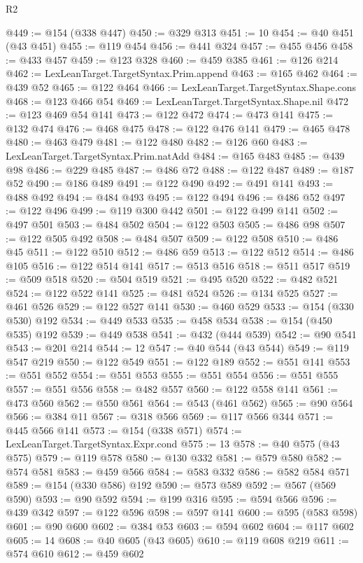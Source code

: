 \begin{lexlean}{R2}
\begin{coremodule}
{{{{{{{{{{{{{{{{{{{{{{{{{{{{{{{{{{{{{{{{{{{{{{{{{{{{{{{{{{{{{{{{{{{{{{{{{{{{{{{{{{{{{{{{{{{{@449 := @154 (@338 @447)
@450 := @329 @313
@451 := 10
@454 := @40 @451 (@43 @451)
@455 := @119 @454
@456 := @441 @324
@457 := @455 @456
@458 := @433 @457
@459 := @123 @328
@460 := @459 @385
@461 := @126 @214
@462 := LexLeanTarget.TargetSyntax.Prim.append
@463 := @165 @462
@464 := @439 @52
@465 := @122 @464
@466 := LexLeanTarget.TargetSyntax.Shape.cons
@468 := @123 @466 @54
@469 := LexLeanTarget.TargetSyntax.Shape.nil
@472 := @123 @469 @54 @141
@473 := @122 @472
@474 := @473 @141
@475 := @132 @474
@476 := @468 @475
@478 := @122 @476 @141
@479 := @465 @478
@480 := @463 @479
@481 := @122 @480
@482 := @126 @60
@483 := LexLeanTarget.TargetSyntax.Prim.natAdd
@484 := @165 @483
@485 := @439 @98
@486 := @229 @485
@487 := @486 @72
@488 := @122 @487
@489 := @187 @52
@490 := @186 @489
@491 := @122 @490
@492 := @491 @141
@493 := @488 @492
@494 := @484 @493
@495 := @122 @494
@496 := @486 @52
@497 := @122 @496
@499 := @119 @300 @442
@501 := @122 @499 @141
@502 := @497 @501
@503 := @484 @502
@504 := @122 @503
@505 := @486 @98
@507 := @122 @505 @492
@508 := @484 @507
@509 := @122 @508
@510 := @486 @45
@511 := @122 @510
@512 := @486 @59
@513 := @122 @512
@514 := @486 @105
@516 := @122 @514 @141
@517 := @513 @516
@518 := @511 @517
@519 := @509 @518
@520 := @504 @519
@521 := @495 @520
@522 := @482 @521
@524 := @122 @522 @141
@525 := @481 @524
@526 := @134 @525
@527 := @461 @526
@529 := @122 @527 @141
@530 := @460 @529
@533 := @154 (@330 @530) @192
@534 := @449 @533
@535 := @458 @534
@538 := @154 (@450 @535) @192
@539 := @449 @538
@541 := @432 (@444 @539)
@542 := @90 @541
@543 := @201 @214
@544 := 12
@547 := @40 @544 (@43 @544)
@549 := @119 @547 @219
@550 := @122 @549
@551 := @122 @189
@552 := @551 @141
@553 := @551 @552
@554 := @551 @553
@555 := @551 @554
@556 := @551 @555
@557 := @551 @556
@558 := @482 @557
@560 := @122 @558 @141
@561 := @473 @560
@562 := @550 @561
@564 := @543 (@461 @562)
@565 := @90 @564
@566 := @384 @11
@567 := @318 @566
@569 := @117 @566 @344
@571 := @445 @566 @141
@573 := @154 (@338 @571)
@574 := LexLeanTarget.TargetSyntax.Expr.cond
@575 := 13
@578 := @40 @575 (@43 @575)
@579 := @119 @578
@580 := @130 @332
@581 := @579 @580
@582 := @574 @581
@583 := @459 @566
@584 := @583 @332
@586 := @582 @584 @571
@589 := @154 (@330 @586) @192
@590 := @573 @589
@592 := @567 (@569 @590)
@593 := @90 @592
@594 := @199 @316
@595 := @594 @566
@596 := @439 @342
@597 := @122 @596
@598 := @597 @141
@600 := @595 (@583 @598)
@601 := @90 @600
@602 := @384 @53
@603 := @594 @602
@604 := @117 @602
@605 := 14
@608 := @40 @605 (@43 @605)
@610 := @119 @608 @219
@611 := @574 @610
@612 := @459 @602
}}}}}}}}}}}}}}}}}}}}}}}}}}}}}}}}}}}}}}}}}}}}}}}}}}}}}}}}}}}}}}}}}}}}}}}}}}}}}}}}}}}}}}}}}}}}
\end{coremodule}
\end{lexlean}
